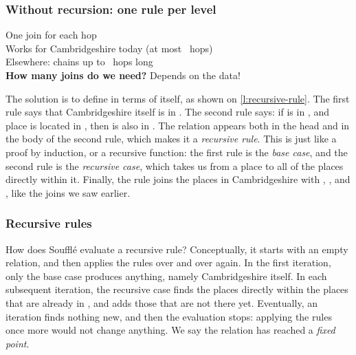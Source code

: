 \begin{frame}
    \label{s:cambs-fixed}
    \frametitle{Without recursion: one rule per level}
    \pause
    \pause
    \vspace{0.5em}
    One join for each  hop\\[0.3em]\pause
    Works for Cambridgeshire today (at most \reccambsdepth\ hops)\\[0.3em]
    Elsewhere: chains up to \recmaxlinks\ hops long\\[0.3em]
    \textbf{How many joins do we need?} Depends on the data!
\end{frame}
\label{l:cambs-fixed}

The solution is to define  in terms of itself, as shown on \autoref{l:recursive-rule}.
The first rule says that Cambridgeshire itself is in .
The second rule says: if  is in , and place  is located in , then  is also in .
The relation  appears both in the head and in the body of the second rule, which makes it a \emph{recursive rule}.
This is just like a proof by induction, or a recursive function: the first rule is the \emph{base case}, and the second rule is the \emph{recursive case}, which takes us from a place to all of the places directly within it.
Finally, the  rule joins the places in Cambridgeshire with , , and , like the joins we saw earlier.

\begin{frame}
    \label{s:recursive-rule}
    \frametitle{Recursive rules}
    \vspace{0.5em}
    {\scriptsize}
\end{frame}
\label{l:recursive-rule}

How does Soufflé evaluate a recursive rule?
Conceptually, it starts with an empty  relation, and then applies the rules over and over again.
In the first iteration, only the base case produces anything, namely Cambridgeshire itself.
In each subsequent iteration, the recursive case finds the places directly within the places that are already in , and adds those that are not there yet.
Eventually, an iteration finds nothing new, and then the evaluation stops: applying the rules once more would not change anything.
We say the relation has reached a \emph{fixed point}.


